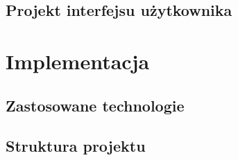 \documentclass[12pt, a4paper, oneside]{report}
\begin{document}


\section{Projekt interfejsu użytkownika}
\label{sec:ui}



\chapter{Implementacja}
\label{chap:implementacja}


\section{Zastosowane technologie}
\label{sec:technologie}



\section{Struktura projektu}
\label{sec:struktura}




\end{document}
